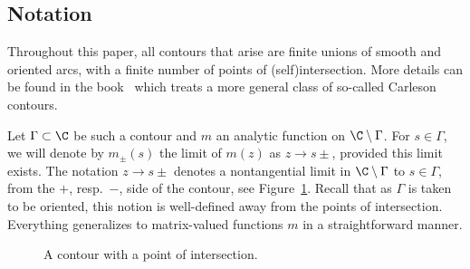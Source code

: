 \subsection{Notation}

Throughout this paper, all contours that arise are finite unions of smooth and oriented arcs, with a finite number of points of (self)intersection. More details can be found in the book~\cite{BK} which treats a more general class of so-called Carleson contours.

Let $\Gamma \subset \C$ be such a contour and $m$ an analytic function on $\C \setminus \Gamma$. For $s \in \Gamma$, we will denote by $m_{\pm}(s)$ the limit of $m(z)$ as $z \to s\pm$, provided this limit exists. The notation $z \to s\pm$ denotes a nontangential limit in $\C \setminus \Gamma$ to $s \in\Gamma$, from the $+$, resp.\ $-$, side of the contour, see Figure~\ref{FigContour}. Recall that as $\Gamma$ is taken to be oriented, this notion is well-defined away from the points of intersection. Everything generalizes to matrix-valued functions $m$ in a straightforward manner.

\begin{figure}[th]\centering\vspace*{2mm}
\caption{A contour with a point of intersection.}\label{FigContour}
\end{figure}

